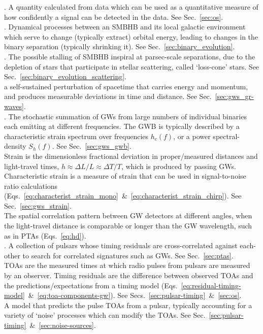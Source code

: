\documentclass[onecolumn,authoryear]{els-mrw}
\begin{document}
\begin{glossary}[Glossary]
    . A quantity calculated from data which can be used as a quantitative measure of how confidently a signal can be detected in the data. See Sec.~\ref{sec:os}. \\
    .  Dynamical processes between an SMBHB and its local galactic environment which serve to change (typically extract) orbital energy, leading to changes in the binary separation (typically shrinking it).  See Sec.~\ref{sec:binary_evolution}. \\
    .  The possible stalling of SMBHB inspiral at parsec-scale separations, due to the depletion of stars that participate in stellar scattering, called `loss-cone' stars.  See Sec.~\ref{sec:binary_evolution_scattering}. \\
     a self-sustained perturbation of spacetime that carries energy and momentum, and produces measurable deviations in time and distance.  See Sec.~\ref{sec:gws_gr-waves}. \\
    .  The stochastic summation of GWs from large numbers of individual binaries each emitting at different frequencies.  The GWB is typically described by a characteristic strain spectrum over frequencies $h_c(f)$, or a power spectral-density $S_h(f)$.  See Sec.~\ref{sec:gws_gwb}. \\
     Strain is the dimensionless fractional deviation in proper/measured distances and light-travel times, $h \approx \Delta L / L \approx \Delta T / T$, which is produced by passing GWs.  Characteristic strain is a measure of strain that can be used in signal-to-noise ratio calculations (Eqs.~\ref{eq:characterist_strain_mono}~\&~\ref{eq:characterist_strain_chirp}).  See Sec.~\ref{sec:gws_strain}. \\
      The spatial correlation pattern between GW detectors at different angles, when the light-travel distance is comparable or longer than the GW wavelength, such as in PTAs (Eqs.~\ref{eq:hd}). \\
    . A collection of pulsars whose timing residuals are cross-correlated against each-other to search for correlated signatures such as GWs.  See Sec.~\ref{sec:ptas}. \\
      TOAs are the measured times at which radio pulses from pulsars are measured by an observer.  Timing residuals are the difference between observed TOAs and the predictions/expectations from a timing model (Eqs.~\ref{eq:residual-timing-model}~\&~\ref{eq:toa-components-gw}).  See Secs.~\ref{sec:pulsar-timing}~\&~\ref{sec:os}. \\
     A model that predicts the pulse TOAs from a pulsar, typically accounting for a variety of `noise' processes which can modify the TOAs.  See Sec.~\ref{sec:pulsar-timing}~\&~\ref{sec:noise-sources}.  \\
    \end{glossary}
\end{document}

